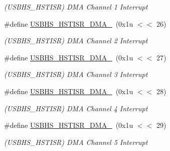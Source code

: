 \begin{DoxyCompactItemize}
\begin{DoxyCompactList}\small\item\em (U\+S\+B\+H\+S\+\_\+\+H\+S\+T\+I\+SR) D\+MA Channel 1 Interrupt \end{DoxyCompactList}\item 
\mbox{\label{group__SAME70__USBHS_gab3f9d3b959cd003b4a776886a18ea4f1}} 
\#define \mbox{\hyperlink{group__SAME70__USBHS_gab3f9d3b959cd003b4a776886a18ea4f1}{U\+S\+B\+H\+S\+\_\+\+H\+S\+T\+I\+S\+R\+\_\+\+D\+M\+A\+\_}}~(0x1u $<$$<$ 26)
\begin{DoxyCompactList}\small\item\em (U\+S\+B\+H\+S\+\_\+\+H\+S\+T\+I\+SR) D\+MA Channel 2 Interrupt \end{DoxyCompactList}\item 
\mbox{\label{group__SAME70__USBHS_gaa2635d3ce3f79939b4bd49adc86c8cb5}} 
\#define \mbox{\hyperlink{group__SAME70__USBHS_gaa2635d3ce3f79939b4bd49adc86c8cb5}{U\+S\+B\+H\+S\+\_\+\+H\+S\+T\+I\+S\+R\+\_\+\+D\+M\+A\+\_}}~(0x1u $<$$<$ 27)
\begin{DoxyCompactList}\small\item\em (U\+S\+B\+H\+S\+\_\+\+H\+S\+T\+I\+SR) D\+MA Channel 3 Interrupt \end{DoxyCompactList}\item 
\mbox{\label{group__SAME70__USBHS_gaed42ea806678b1da3552cfaea2dd4d60}} 
\#define \mbox{\hyperlink{group__SAME70__USBHS_gaed42ea806678b1da3552cfaea2dd4d60}{U\+S\+B\+H\+S\+\_\+\+H\+S\+T\+I\+S\+R\+\_\+\+D\+M\+A\+\_}}~(0x1u $<$$<$ 28)
\begin{DoxyCompactList}\small\item\em (U\+S\+B\+H\+S\+\_\+\+H\+S\+T\+I\+SR) D\+MA Channel 4 Interrupt \end{DoxyCompactList}\item 
\mbox{\label{group__SAME70__USBHS_gaf0dbc9654f5ac451ec8bf9dcd61f4ba0}} 
\#define \mbox{\hyperlink{group__SAME70__USBHS_gaf0dbc9654f5ac451ec8bf9dcd61f4ba0}{U\+S\+B\+H\+S\+\_\+\+H\+S\+T\+I\+S\+R\+\_\+\+D\+M\+A\+\_}}~(0x1u $<$$<$ 29)
\begin{DoxyCompactList}\small\item\em (U\+S\+B\+H\+S\+\_\+\+H\+S\+T\+I\+SR) D\+MA Channel 5 Interrupt \end{DoxyCompactList}\item 

\end{DoxyCompactItemize}
